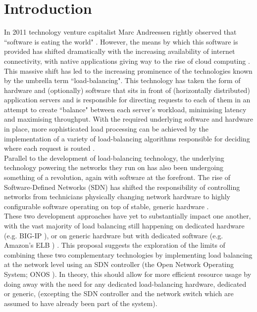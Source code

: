 \section{Introduction} %

In 2011 technology venture capitalist Marc Andreessen rightly observed that ``software is eating the world" \cite{andreessen_2011}. However, the means by which this software is provided has shifted dramatically with the increasing availability of internet connectivity, with native applications giving way to the rise of cloud computing \cite{goasduff_2021}. This massive shift has led to the increasing prominence of the technologies known by the umbrella term ``load-balancing". This technology has taken the form of hardware and (optionally) software that sits in front of (horizontally distributed) application servers and is responsible for directing requests to each of them in an attempt to create ``balance" between each server's workload, minimising latency and maximising throughput. With the required underlying software and hardware in place, more sophisticated load processing can be achieved by the implementation of a variety of load-balancing algorithms responsible for deciding where each request is routed \cite{loadBalancingAlgorithms}. \\

Parallel to the development of load-balancing technology, the underlying technology powering the networks they run on has also been undergoing something of a revolution, again with software at the forefront. The rise of Software-Defined Networks (SDN) has shifted the responsibility of controlling networks from technicians physically changing network hardware to highly configurable software operating on top of stable, generic hardware \cite{sdn_wp}. \\

These two development approaches have yet to substantially impact one another, with the vast majority of load balancing still happening on dedicated hardware (e.g. BIG-IP \cite{BIG-IP}), or on generic hardware but with dedicated software (e.g. Amazon's ELB \cite{awsALB}) \cite{market_share}. This proposal suggests the exploration of the limits of combining these two complementary technologies by implementing load balancing at the network level using an SDN controller (the Open Network Operating System; ONOS \cite{ONOS}). In theory, this should allow for more efficient resource usage by doing away with the need for any dedicated load-balancing hardware, dedicated or generic, (excepting the SDN controller and the network switch which are assumed to have already been part of the system). \\

